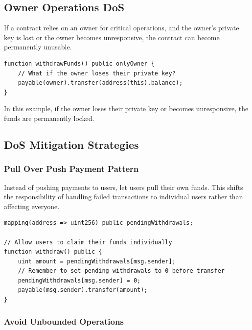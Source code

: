 \documentclass[12pt]{article}
\begin{document}
\subsection{Owner Operations DoS}

If a contract relies on an owner for critical operations, and the owner's private key is lost or the owner becomes unresponsive, the contract can become permanently unusable.

\noindent
\begin{minipage}{\textwidth}
\begin{lstlisting}[language=Solidity, caption=Owner Operations DoS Example]
function withdrawFunds() public onlyOwner {
    // What if the owner loses their private key?
    payable(owner).transfer(address(this).balance);
}
\end{lstlisting}
\end{minipage}

\noindent
In this example, if the owner loses their private key or becomes unresponsive, the funds are permanently locked.

\subsection{DoS Mitigation Strategies}

\subsubsection*{Pull Over Push Payment Pattern}

Instead of pushing payments to users, let users pull their own funds. This shifts the responsibility of handling failed transactions to individual users rather than affecting everyone.

\noindent
\begin{minipage}{\textwidth}
\begin{lstlisting}[language=Solidity, caption=Pull Over Push Example]
mapping(address => uint256) public pendingWithdrawals;

// Allow users to claim their funds individually
function withdraw() public {
    uint amount = pendingWithdrawals[msg.sender];
    // Remember to set pending withdrawals to 0 before transfer
    pendingWithdrawals[msg.sender] = 0;
    payable(msg.sender).transfer(amount);
}
\end{lstlisting}
\end{minipage}

\subsubsection*{Avoid Unbounded Operations}
\end{document}
